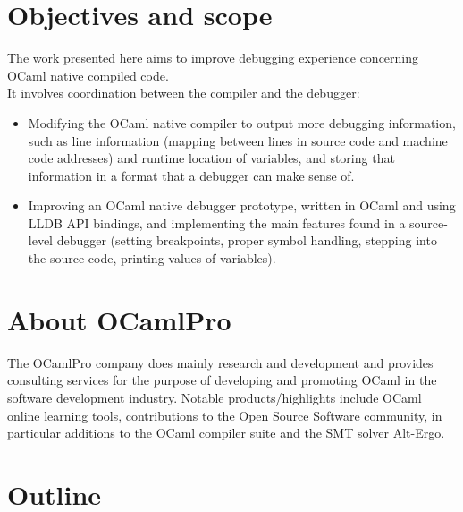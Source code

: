 \newpage

\section{Objectives and scope\label{sec:objective}}

The work presented here aims to improve debugging experience concerning OCaml
native compiled code. \\
It involves coordination between the compiler and the debugger:

\begin{itemize}
    \item Modifying the OCaml native compiler to output more debugging
        information, such as line information (mapping between lines in source
        code and machine code addresses) and runtime location of variables, and
        storing that information in a format that a debugger can make
        sense of.
    \item  Improving an OCaml native debugger prototype, written in OCaml and using LLDB
        API bindings, and implementing the main features found in a source-level
        debugger (setting breakpoints, proper symbol handling, stepping into the source
        code, printing values of variables).
\end{itemize}

\section{About OCamlPro}

The OCamlPro company does mainly research and development and provides
consulting services for the purpose of developing and promoting OCaml in the
software development industry.
Notable products/highlights include OCaml online learning tools, contributions
to the Open Source Software community, in particular additions to the OCaml
compiler suite and the SMT solver Alt-Ergo.





\section{Outline\label{sec:outline}}

